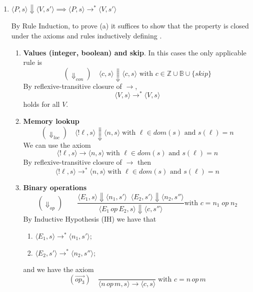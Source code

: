 \begin{solution}
\begin{enumerate}[label=(\alph*)]
\item $ \langle P,s\rangle \Downarrow \langle V,s'\rangle \implies \langle P,s\rangle \rightarrow^* \langle V,s'\rangle$

By Rule Induction, to prove (a) it suffices to show that the property is closed under the axioms and rules inductively defining . 

\begin{enumerate}[label=(\alph{enumi}).\arabic*]
\item \textbf{Values (integer, boolean) and skip}. In this cases the only applicable rule is \[(\Downarrow_{con}) \quad \langle c,s\rangle \Downarrow \langle c,s\rangle \text{ with } c\in \mathbb{Z}\cup\mathbb{B}\cup \{skip\}\]
By reflexive-transitive closure of $\rightarrow$,  
\[\langle V,s\rangle \rightarrow^* \langle V,s\rangle\]
holds for all $V$.
\item \textbf{Memory lookup} 
\[(\Downarrow_{loc}) \quad \langle !\ell , s\rangle \Downarrow \langle n,s \rangle \;\text{with }\ell \in dom(s) \text{ and } s(\ell) = n \]
We can use the axiom \[\langle !\ell , s\rangle \rightarrow \langle n,s \rangle \;\text{with }\ell \in dom(s) \text{ and } s(\ell) = n \] 
By reflexive-transitive closure of $\rightarrow$ then 
\[\langle !\ell , s\rangle \rightarrow^* \langle n,s \rangle \;\text{with }\ell \in dom(s) \text{ and } s(\ell) = n \] 
\item \textbf{Binary operations}
 \[ (\Downarrow_{op}) \quad  \quad \frac{\langle E_1,s\rangle \Downarrow \langle n_1, s'\rangle \; \; \langle E_2,s'\rangle \Downarrow \langle n_2, s''\rangle}{\langle E_1 \, op \, E_2,s\rangle \Downarrow \langle c, s''\rangle} \text{with }c=n_1\;op\;n_2\]
 By Inductive Hypothesis (IH) we have that 
 \begin{enumerate}[label=(\roman*)]
     \item $\langle E_1,s\rangle \rightarrow^* \langle n_1, s'\rangle$;
     \item $\langle E_2,s'\rangle \rightarrow^* \langle n_2, s''\rangle$;
 \end{enumerate}
 and we have the axiom
           \[ (\overset{\rightarrow}{op_3}) \quad \frac{}{\langle n \, op \, m,s\rangle \to \langle c, s\rangle} \; \text{with } c = n \, op \, m\]


\end{enumerate}
\end{enumerate}
\end{solution}
